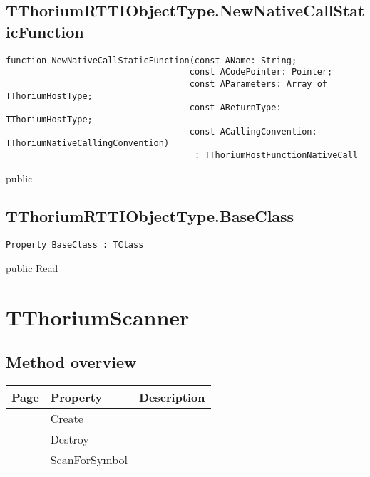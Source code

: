 \subsection{TThoriumRTTIObjectType.NewNativeCallStaticFunction}
\label{thoriumcore:thorium:tthoriumrttiobjecttype:newnativecallstaticfunction}
\begin{FPCList}
\Synopsis
\Declaration 

\begin{verbatim}
function NewNativeCallStaticFunction(const AName: String;
                                    const ACodePointer: Pointer;
                                    const AParameters: Array of TThoriumHostType;
                                    const AReturnType: TThoriumHostType;
                                    const ACallingConvention: TThoriumNativeCallingConvention)
                                     : TThoriumHostFunctionNativeCall
\end{verbatim}
\Visibility
public
\Description
\Errors
\end{FPCList}
\subsection{TThoriumRTTIObjectType.BaseClass}
\label{thoriumcore:thorium:tthoriumrttiobjecttype:baseclass}
\begin{FPCList}
\Synopsis
\Declaration 

\begin{verbatim}
Property BaseClass : TClass
\end{verbatim}
\Visibility
public
\Access
Read
\Description
\end{FPCList}
\section{TThoriumScanner}
\label{thoriumcore:thorium:tthoriumscanner}
\subsection{Method overview}
\label{thoriumcore:thorium:tthoriumscanner:methods}
\begin{tabularx}{\textwidth}{llX}
Page & Property & Description  \\ \hline
\pageref{thoriumcore:thorium:tthoriumscanner:create} & Create  &  \\
\pageref{thoriumcore:thorium:tthoriumscanner:destroy} & Destroy  &  \\
\pageref{thoriumcore:thorium:tthoriumscanner:scanforsymbol} & ScanForSymbol  &  \\
\hline
\end{tabularx}
